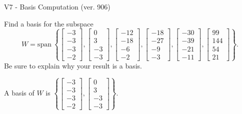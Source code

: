 \begin{exercise}
  \begin{exerciseTitle}V7 - Basis Computation (ver. 906)\end{exerciseTitle}
  \begin{exerciseStatement}
    Find a basis for the subspace 
\[W=\mathrm{span}\ \left\{\left[\begin{array}{r}
-3 \\
-3 \\
-3 \\
-2
\end{array}\right] , \left[\begin{array}{r}
0 \\
3 \\
-3 \\
-3
\end{array}\right] , \left[\begin{array}{r}
-12 \\
-18 \\
-6 \\
-2
\end{array}\right] , \left[\begin{array}{r}
-18 \\
-27 \\
-9 \\
-3
\end{array}\right] , \left[\begin{array}{r}
-30 \\
-39 \\
-21 \\
-11
\end{array}\right] , \left[\begin{array}{r}
99 \\
144 \\
54 \\
21
\end{array}\right]\right\}.\]
 Be sure to explain why your result is a basis.


  \end{exerciseStatement}
  \begin{exerciseAnswer}
   A basis of \(W\) is  \(\left\{\left[\begin{array}{r}
-3 \\
-3 \\
-3 \\
-2
\end{array}\right] , \left[\begin{array}{r}
0 \\
3 \\
-3 \\
-3
\end{array}\right]\right\}\).
  


  \end{exerciseAnswer}
\end{exercise}
